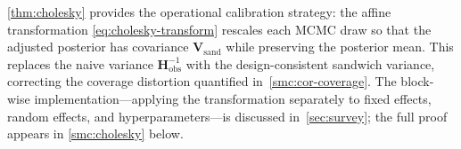 \begin{remark}
\label{smc:rem-cholesky-calibration}
  \cref{thm:cholesky} provides the operational calibration
  strategy: the affine transformation
  \eqref{eq:cholesky-transform} rescales each MCMC draw so that
  the adjusted posterior has covariance
  $\mathbf{V}_{\mathrm{sand}}$ while preserving the posterior mean.
  This replaces the naive variance $\mathbf{H}_{\mathrm{obs}}^{-1}$
  with the design-consistent sandwich variance, correcting the
  coverage distortion quantified in~\cref{smc:cor-coverage}.  The
  block-wise implementation---applying the transformation separately
  to fixed effects, random effects, and hyperparameters---is discussed
  in~\cref{sec:survey}; the full proof appears in
  \cref{smc:cholesky} below.
\end{remark}
